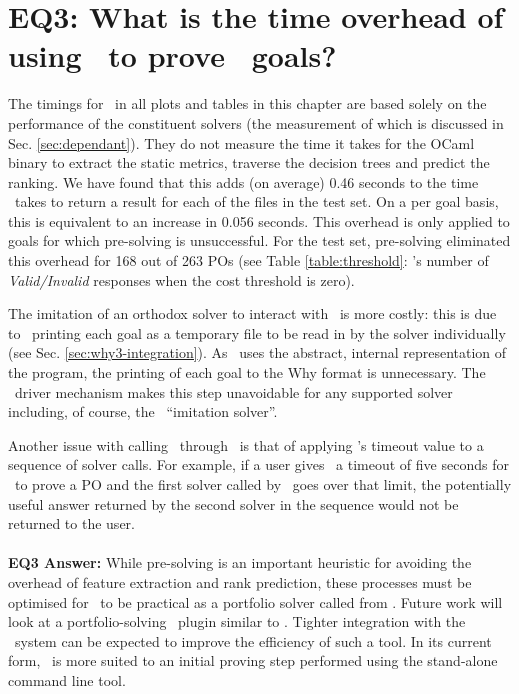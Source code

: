 \section{EQ3: What is the time overhead of using \where~to prove \why~goals?}

\label{sec:eq3}

The timings for \where~in all plots and tables in this chapter are based solely on the performance of the constituent solvers (the measurement of which is discussed in Sec. \ref{sec:dependant}). They do not measure the time it takes for the OCaml binary to extract the static metrics, traverse the decision trees and predict the ranking. 
We have found that this adds (on average) 0.46 seconds to the time \where~takes to return a result for each of the files in the test set. 
On a per goal basis, this is equivalent to an increase in 0.056 seconds.
This overhead is only applied to goals for which pre-solving is unsuccessful.  
For the test set, pre-solving eliminated this overhead for 168 out of 263 POs (see Table \ref{table:threshold}: \where's number of \textit{Valid/Invalid} responses when the cost threshold is zero).

The imitation of an orthodox solver to interact with \why~is more costly: this is due to \why~printing each goal as a temporary file to be read in by the solver individually (see Sec. \ref{sec:why3-integration}). 
As \where~uses the abstract, internal representation of the program, the printing of each goal to the Why format is unnecessary.
The \why~driver mechanism makes this step unavoidable for any supported solver including, of course, the \where~``imitation solver''.

Another issue with calling \where~through \why~is that of applying \why's timeout value to a sequence of solver calls. 
For example, if a user gives \why~a timeout of five seconds for \where~to prove a PO and the first solver called by \where~goes over that limit, the potentially useful answer returned by the second solver in the sequence would not be returned to the user. \\
\\
\textbf{EQ3 Answer:}
While pre-solving is an important heuristic for avoiding the overhead of feature extraction and rank prediction, these processes must be optimised for \where~to be practical as a portfolio solver called from \why.   
Future work will look at a portfolio-solving \why~plugin similar to \where. Tighter integration with the \why~system can be expected to improve the efficiency of such a tool.      
In its current form, \where~is more suited to an initial proving step performed using the stand-alone command line tool.

